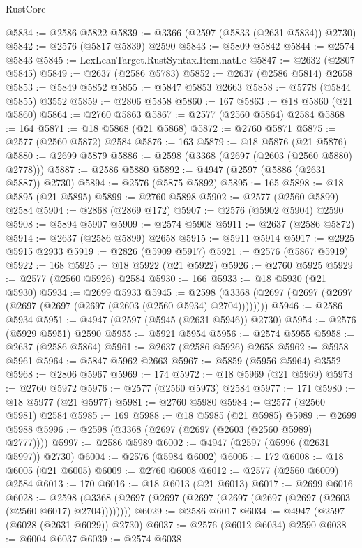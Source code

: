 \begin{lexlean}{RustCore}
\begin{coremodule}
@5834 := @2586 @5822
@5839 := @3366 (@2597 (@5833 (@2631 @5834)) @2730)
@5842 := @2576 (@5817 @5839) @2590
@5843 := @5809 @5842
@5844 := @2574 @5843
@5845 := LexLeanTarget.RustSyntax.Item.natLe
@5847 := @2632 (@2807 @5845)
@5849 := @2637 (@2586 @5783)
@5852 := @2637 (@2586 @5814) @2658
@5853 := @5849 @5852
@5855 := @5847 @5853 @2663
@5858 := @5778 (@5844 @5855) @3552
@5859 := @2806 @5858
@5860 := 167
@5863 := @18 @5860 (@21 @5860)
@5864 := @2760 @5863
@5867 := @2577 (@2560 @5864) @2584
@5868 := 164
@5871 := @18 @5868 (@21 @5868)
@5872 := @2760 @5871
@5875 := @2577 (@2560 @5872) @2584
@5876 := 163
@5879 := @18 @5876 (@21 @5876)
@5880 := @2699 @5879
@5886 := @2598 (@3368 (@2697 (@2603 (@2560 @5880) @2778)))
@5887 := @2586 @5880
@5892 := @4947 (@2597 (@5886 (@2631 @5887)) @2730)
@5894 := @2576 (@5875 @5892)
@5895 := 165
@5898 := @18 @5895 (@21 @5895)
@5899 := @2760 @5898
@5902 := @2577 (@2560 @5899) @2584
@5904 := @2868 (@2869 @172)
@5907 := @2576 (@5902 @5904) @2590
@5908 := @5894 @5907
@5909 := @2574 @5908
@5911 := @2637 (@2586 @5872)
@5914 := @2637 (@2586 @5899) @2658
@5915 := @5911 @5914
@5917 := @2925 @5915 @2933
@5919 := @2826 (@5909 @5917)
@5921 := @2576 (@5867 @5919)
@5922 := 168
@5925 := @18 @5922 (@21 @5922)
@5926 := @2760 @5925
@5929 := @2577 (@2560 @5926) @2584
@5930 := 166
@5933 := @18 @5930 (@21 @5930)
@5934 := @2699 @5933
@5945 := @2598 (@3368 (@2697 (@2697 (@2697 (@2697 (@2697 (@2697 (@2603 (@2560 @5934) @2704))))))))
@5946 := @2586 @5934
@5951 := @4947 (@2597 (@5945 (@2631 @5946)) @2730)
@5954 := @2576 (@5929 @5951) @2590
@5955 := @5921 @5954
@5956 := @2574 @5955
@5958 := @2637 (@2586 @5864)
@5961 := @2637 (@2586 @5926) @2658
@5962 := @5958 @5961
@5964 := @5847 @5962 @2663
@5967 := @5859 (@5956 @5964) @3552
@5968 := @2806 @5967
@5969 := 174
@5972 := @18 @5969 (@21 @5969)
@5973 := @2760 @5972
@5976 := @2577 (@2560 @5973) @2584
@5977 := 171
@5980 := @18 @5977 (@21 @5977)
@5981 := @2760 @5980
@5984 := @2577 (@2560 @5981) @2584
@5985 := 169
@5988 := @18 @5985 (@21 @5985)
@5989 := @2699 @5988
@5996 := @2598 (@3368 (@2697 (@2697 (@2603 (@2560 @5989) @2777))))
@5997 := @2586 @5989
@6002 := @4947 (@2597 (@5996 (@2631 @5997)) @2730)
@6004 := @2576 (@5984 @6002)
@6005 := 172
@6008 := @18 @6005 (@21 @6005)
@6009 := @2760 @6008
@6012 := @2577 (@2560 @6009) @2584
@6013 := 170
@6016 := @18 @6013 (@21 @6013)
@6017 := @2699 @6016
@6028 := @2598 (@3368 (@2697 (@2697 (@2697 (@2697 (@2697 (@2697 (@2603 (@2560 @6017) @2704))))))))
@6029 := @2586 @6017
@6034 := @4947 (@2597 (@6028 (@2631 @6029)) @2730)
@6037 := @2576 (@6012 @6034) @2590
@6038 := @6004 @6037
@6039 := @2574 @6038

\end{coremodule}
\end{lexlean}
